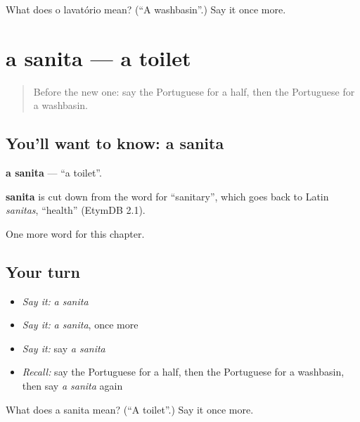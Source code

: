 \begin{tcolorbox}[breakable,colback=teal!4,colframe=teal!35!black,title={Before you move on}]
What does o lavatório mean? (\textquotedblleft{}A washbasin\textquotedblright{}.) Say it once more.
\end{tcolorbox}
\section[a sanita]{a sanita — a toilet}

\label{lesson:PT-C229-sanita}



\begin{quote}
Before the new one: say the Portuguese for a half, then the Portuguese for a washbasin.
\end{quote}

\subsection*{You'll want to know: a sanita}
\textbf{a sanita} — \textquotedblleft{}a toilet\textquotedblright{}.

\begin{cousinweb}
\textbf{sanita} is cut down from the word for \textquotedblleft{}sanitary\textquotedblright{}, which goes back to Latin \emph{sanitas}, \textquotedblleft{}health\textquotedblright{} (EtymDB 2.1).
\end{cousinweb}

\begin{grammarlens}[title={What you've built}]
One more word for this chapter.
\end{grammarlens}

\subsection*{Your turn}
\begin{itemize}
\raggedright
  \item \emph{Say it:} \emph{a sanita}
  \item \emph{Say it:} \emph{a sanita}, once more
  \item \emph{Say it:} say \emph{a sanita}
  \item \emph{Recall:} say the Portuguese for a half, then the Portuguese for a washbasin, then say \emph{a sanita} again
\end{itemize}

\begin{tcolorbox}[breakable,colback=teal!4,colframe=teal!35!black,title={Before you move on}]
What does a sanita mean? (\textquotedblleft{}A toilet\textquotedblright{}.) Say it once more.
\end{tcolorbox}
